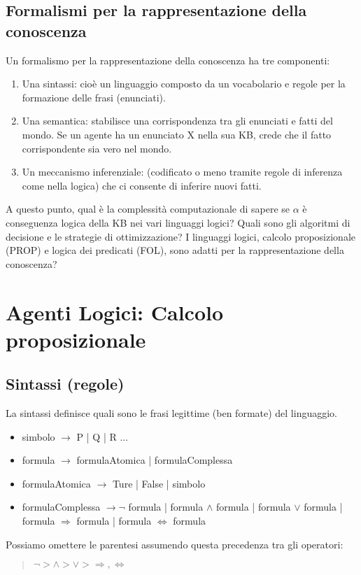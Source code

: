 \documentclass{article}
\begin{document}
\subsection{Formalismi per la rappresentazione della conoscenza}
Un formalismo per la rappresentazione della conoscenza ha tre componenti:
\begin{enumerate}
    \item Una sintassi: cioè un linguaggio composto da un vocabolario e regole per la formazione delle frasi (enunciati).
    \item Una semantica: stabilisce una corrispondenza tra gli enunciati e fatti del mondo. Se un agente ha un enunciato X nella sua KB, crede che il fatto corrispondente sia vero nel mondo.
    \item Un meccanismo inferenziale: (codificato o meno tramite regole di inferenza come nella logica) che ci consente di inferire nuovi fatti. 
\end{enumerate}
A questo punto, qual è la complessità computazionale di sapere se $\alpha$ è conseguenza logica della KB nei vari linguaggi logici? Quali sono gli algoritmi di decisione e le strategie di ottimizzazione? I linguaggi logici, calcolo proposizionale (PROP) e logica dei predicati (FOL), sono adatti per la rappresentazione della conoscenza?

\section{Agenti Logici: Calcolo proposizionale}

\subsection{Sintassi (regole)}
La sintassi definisce quali sono le frasi legittime (ben formate) del linguaggio.
\begin{itemize}
    \item simbolo $\to$ P | Q | R ...
    \item formula $\to$ formulaAtomica | formulaComplessa
    \item formulaAtomica $\to$ Ture | False | simbolo
    \item formulaComplessa $\to \neg$ formula | formula $\land$ formula | formula $\lor$ formula | formula $\Rightarrow$ formula | formula $\Leftrightarrow$ formula
\end{itemize}
Possiamo omettere le parentesi assumendo questa precedenza tra gli operatori:
\begin{quote}
    $\neg  >  \land  >  \lor  >  \Rightarrow, \Leftrightarrow$
\end{quote}
\end{document}
